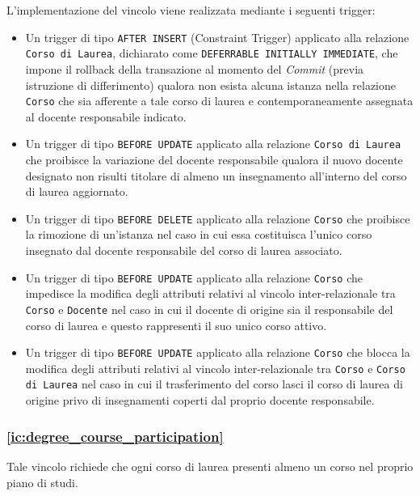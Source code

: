 \documentclass[a4paper,11pt]{article}
\begin{document}
L'implementazione del vincolo viene realizzata mediante i seguenti trigger:
\begin{itemize}
    \item Un trigger di tipo \texttt{AFTER INSERT} (Constraint Trigger) applicato alla relazione \texttt{Corso di Laurea}, dichiarato come \texttt{DEFERRABLE INITIALLY IMMEDIATE}, che impone il rollback della transazione al momento del \textit{Commit} (previa istruzione di differimento) qualora non esista alcuna istanza nella relazione \texttt{Corso} che sia afferente a tale corso di laurea e contemporaneamente assegnata al docente responsabile indicato.
    \item Un trigger di tipo \texttt{BEFORE UPDATE} applicato alla relazione \texttt{Corso di Laurea} che proibisce la variazione del docente responsabile qualora il nuovo docente designato non risulti titolare di almeno un insegnamento all'interno del corso di laurea aggiornato.
    \item Un trigger di tipo \texttt{BEFORE DELETE} applicato alla relazione \texttt{Corso} che proibisce la rimozione di un'istanza nel caso in cui essa costituisca l'unico corso insegnato dal docente responsabile del corso di laurea associato.
    \item Un trigger di tipo \texttt{BEFORE UPDATE} applicato alla relazione \texttt{Corso} che impedisce la modifica degli attributi relativi al vincolo inter-relazionale tra \texttt{Corso} e \texttt{Docente} nel caso in cui il docente di origine sia il responsabile del corso di laurea e questo rappresenti il suo unico corso attivo.
    \item Un trigger di tipo \texttt{BEFORE UPDATE} applicato alla relazione \texttt{Corso} che blocca la modifica degli attributi relativi al vincolo inter-relazionale tra \texttt{Corso} e \texttt{Corso di Laurea} nel caso in cui il trasferimento del corso lasci il corso di laurea di origine privo di insegnamenti coperti dal proprio docente responsabile.
\end{itemize}

\subsubsection{\ref{ic:degree_course_participation}}

Tale vincolo richiede che ogni corso di laurea presenti almeno un corso nel proprio piano di studi.
\end{document}
